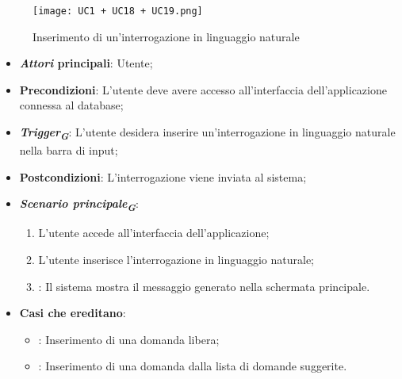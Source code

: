 \begin{figure}[h]
    \centering
    \texttt{[image: UC1 + UC18 + UC19.png]}
    \caption{Inserimento di un'interrogazione in linguaggio naturale}
\end{figure}

\begin{itemize}
    \item \textbf{\emph{Attori} principali}: Utente;
    \item \textbf{Precondizioni}: L'utente deve avere accesso all'interfaccia dell'applicazione connessa al database;
    \item \textbf{\emph{Trigger}\textsubscript{\textbf{\textit{G}}}}: L'utente desidera inserire un'interrogazione in linguaggio naturale nella barra di input;
    \item \textbf{Postcondizioni}: L'interrogazione viene inviata al sistema;
    \item \textbf{\emph{Scenario principale}\textsubscript{\textbf{\textit{G}}}}:
    \begin{enumerate}
        \item L'utente accede all'interfaccia dell'applicazione;
        \item L'utente inserisce l'interrogazione in linguaggio naturale;
        \item {}: Il sistema mostra il messaggio generato nella schermata principale.
    \end{enumerate}
    \item \textbf{Casi che ereditano}:
    \begin{itemize}
        \item {}: Inserimento di una domanda libera;
        \item {}: Inserimento di una domanda dalla lista di domande suggerite.
    \end{itemize}
\end{itemize}

\newpage

\hypertarget{UC18}{}
